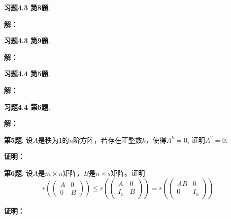 
\renewcommand{\newpageorvspace}{\vspace{2em}}

\date{2021-11-26  第五次习题课}



\maketitle

{\bf 习题4.3 第8题}. 

{\bf 解：}

\newpageorvspace

{\bf 习题4.3 第9题}. 

{\bf 解：}

\newpageorvspace

{\bf 习题4.4 第5题}. 

{\bf 解：}

\newpageorvspace

{\bf 习题4.4 第6题}. 

{\bf 解：}

\newpageorvspace

{\bf 第5题}. 设$A$是秩为1的$n$阶方阵，若存在正整数$k$，使得$A^k = 0$, 证明$A^2 = 0$.

{\bf 证明：}

\newpageorvspace

{\bf 第6题}. 设$A$是$m\times n$矩阵，$B$是$n\times s$矩阵。证明
$$r(\begin{pmatrix} A & 0 \\ 0 & B \end{pmatrix}) \leqslant r(\begin{pmatrix} A & 0 \\ I_n & B \end{pmatrix}) = r(\begin{pmatrix} AB & 0 \\ 0 & I_n \end{pmatrix})$$

{\bf 证明：}


